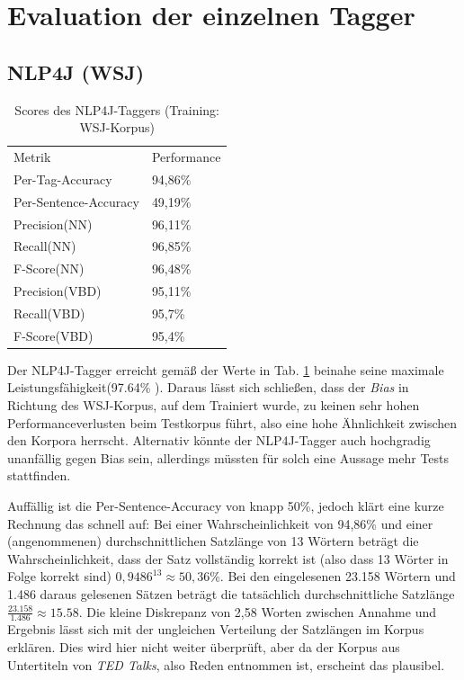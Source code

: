 \section{Evaluation der einzelnen Tagger}
\label{sec:eval:detail}

\subsection{NLP4J (WSJ)}
\label{sec:eval:detail:nlp4j}

\begin{table}[htb]
\centering
\captionsetup{justification=centering,margin=2cm}
\begin{tabular}{l|l}
Metrik & Performance \\
\cline{1-2}
Per-Tag-Accuracy & 94,86\%\\
Per-Sentence-Accuracy & 49,19\%\\
\cline{1-2}
Precision(NN) & 96,11\%\\
Recall(NN) & 96,85\%\\
F-Score(NN) & 96,48\%\\
\cline{1-2}
Precision(VBD) & 95,11\%\\
Recall(VBD) & 95,7\%\\
F-Score(VBD) & 95,4\%
\end{tabular}
\vspace{3mm}
\caption{Scores des NLP4J-Taggers (Training: WSJ-Korpus)}
\label{tab:eval:detail:nlp4j}
\end{table}

Der NLP4J-Tagger erreicht gemäß der Werte in Tab. \ref{tab:eval:detail:nlp4j} beinahe seine maximale Leistungsfähigkeit(97.64\% \cite{choi}). Daraus lässt sich schließen, dass der \textit{Bias} in Richtung des WSJ-Korpus, auf dem Trainiert wurde, zu keinen sehr hohen Performanceverlusten beim Testkorpus führt, also eine hohe Ähnlichkeit zwischen den Korpora herrscht. Alternativ könnte der NLP4J-Tagger auch hochgradig unanfällig gegen Bias sein, allerdings müssten für solch eine Aussage mehr Tests stattfinden. 

Auffällig ist die Per-Sentence-Accuracy von knapp 50\%, jedoch klärt eine kurze Rechnung das schnell auf: Bei einer Wahrscheinlichkeit von 94,86\% und einer (angenommenen) durchschnittlichen Satzlänge von 13 Wörtern beträgt die Wahrscheinlichkeit, dass der Satz vollständig korrekt ist (also dass 13 Wörter in Folge korrekt sind) $0,9486^{13}\approx 50,36\% $. Bei den eingelesenen 23.158 Wörtern und 1.486 daraus gelesenen Sätzen beträgt die tatsächlich durchschnittliche Satzlänge $\frac{23.158}{1.486}\approx 15.58 $. Die kleine Diskrepanz von 2,58 Worten zwischen Annahme und Ergebnis lässt sich mit der ungleichen Verteilung der Satzlängen im Korpus erklären. Dies wird hier nicht weiter überprüft, aber da der Korpus aus Untertiteln von \textit{TED Talks}, also Reden entnommen ist, erscheint das plausibel.


